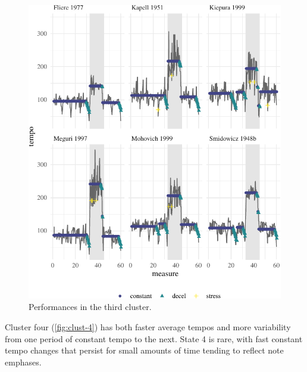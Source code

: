 \documentclass[aoas]{aoas/imsart}
\begin{document}
\begin{figure}

{\centering \includegraphics{gfx/clust-3-1} 

}

\caption{Performances in the third cluster.}\label{fig:clust-3}
\end{figure}

Cluster four (\autoref{fig:clust-4}) has both faster average tempos and
more variability from one period of constant tempo to the next. State 4
is rare, with fast constant tempo changes that persist for small amounts
of time tending to reflect note emphases.
\end{document}

